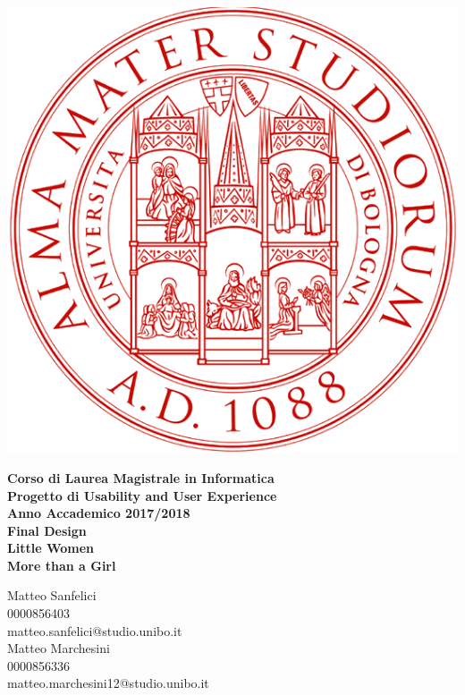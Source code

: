 \documentclass[12pt,a4paper]{report}
\begin{document}
\begin{titlepage}
\vspace{15mm}
\begin{center}
  \includegraphics{"Images Latex/Project Management Report/UniBo-Universita-di-Bologna"}
\end{center}
\begin{center}
{\normalsize{\bf Corso di Laurea Magistrale in Informatica}}\\
\vspace{5mm}
{\Large{\bf Progetto di Usability and User Experience}}\\
\vspace{5mm}
{\normalsize{\bf Anno Accademico 2017/2018}}\\
\vspace{20mm}
{\normalsize{\bf Final Design}}\\
\vspace{5mm}
{\Huge{\bf Little Women}}\\
\vspace{5mm}
{\Large{\bf More than a Girl}}\\
\vspace{25mm}
\end{center}
\begin{flushright}
{\large{Matteo Sanfelici\\0000856403\\matteo.sanfelici@studio.unibo.it\\}}
\vspace{5mm}
{\large{Matteo Marchesini\\0000856336\\matteo.marchesini12@studio.unibo.it}}
\end{flushright}
\end{titlepage}
\tableofcontents
\end{document}
